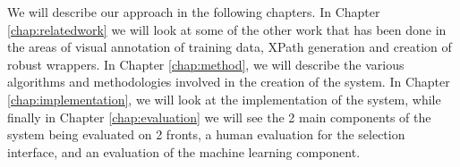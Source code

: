 We will describe our approach in the following chapters. In Chapter \ref{chap:relatedwork} we
will look at some of the other work that has been done in the areas of visual annotation of
training data, XPath generation and creation of robust wrappers. In Chapter \ref{chap:method},
we will describe the various algorithms and methodologies involved in the creation of the
system. In Chapter \ref{chap:implementation}, we will look at the implementation of the system,
while finally in Chapter \ref{chap:evaluation} we will see the 2 main components of the system
being evaluated on 2 fronts, a human evaluation for the selection interface, and an evaluation
of the machine learning component.